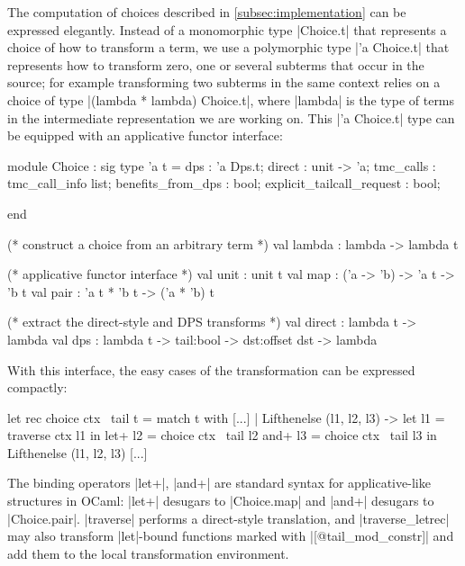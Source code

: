 The computation of choices described in \cref{subsec:implementation} can be expressed elegantly. Instead of a monomorphic type \ocaml|Choice.t| that represents a choice of how to transform a term, we use a polymorphic type \ocaml|'a Choice.t| that represents how to transform zero, one or several subterms that occur in the source; for example transforming two subterms in the same context relies on a choice of type \ocaml|(lambda * lambda) Choice.t|, where \ocaml|lambda| is the type of terms in the intermediate representation we are working on. This \ocaml|'a Choice.t| type can be equipped with an applicative functor interface:

\begin{minipage}{0.4\linewidth}
\begin{Ocaml}
module Choice : sig
  type 'a t = {
    dps : 'a Dps.t;
    direct : unit -> 'a;
    tmc_calls : tmc_call_info list;
    benefits_from_dps : bool;
    explicit_tailcall_request : bool;
  }





end
\end{Ocaml}
\end{minipage}
\hfill
\begin{minipage}{0.5\linewidth}
\begin{Ocaml}
  (* construct a choice from an arbitrary term *)
  val lambda : lambda -> lambda t

  (* applicative functor interface *)
  val unit : unit t
  val map : ('a -> 'b) -> 'a t -> 'b t
  val pair : 'a t * 'b t -> ('a * 'b) t

  (* extract the direct-style and DPS transforms *)
  val direct : lambda t -> lambda
  val dps :
    lambda t -> tail:bool -> dst:offset dst ->
    lambda
\end{Ocaml}
\end{minipage}

With this interface, the easy cases of the transformation can be expressed compactly:
\begin{Ocaml}
  let rec choice ctx ~tail t =
    match t with
    [...]
    | Lifthenelse (l1, l2, l3) ->
        let l1 = traverse ctx l1 in
        let+ l2 = choice ctx ~tail l2
        and+ l3 = choice ctx ~tail l3
        in Lifthenelse (l1, l2, l3)
    [...]
\end{Ocaml}
The binding operators \ocaml|let+|, \ocaml|and+| are standard syntax for applicative-like structures in OCaml: \ocaml|let+| desugars to \ocaml|Choice.map| and \ocaml|and+| desugars to \ocaml|Choice.pair|. \ocaml|traverse| performs a direct-style translation, and \ocaml|traverse_letrec| may also transform \ocaml|let|-bound functions marked with \ocaml|[@tail_mod_constr]| and add them to the local transformation environment.

